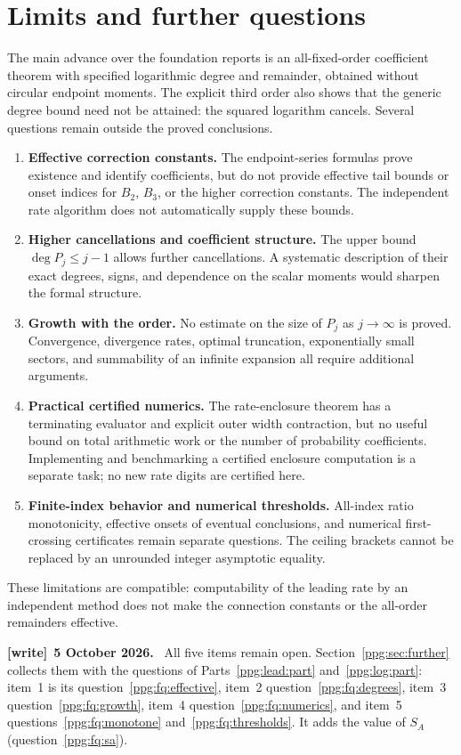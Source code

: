 \documentclass[11pt,letterpaper]{article}
\theoremstyle{remark}\newtheorem{remark}[theorem]{Remark}
\numberwithin{equation}{section}
\newenvironment{writenote}[1][]{\par\smallskip\begingroup\small
 \noindent\textbf{[write]}\if\relax\detokenize{#1}\relax\else~\textbf{#1.}\fi\ }%
 {\par\endgroup\smallskip}
\begin{document}
\section{Limits and further questions}\label{ppg:all:sec:limits}
The main advance over the foundation reports is an all-fixed-order coefficient theorem with specified logarithmic degree and remainder, obtained without circular endpoint moments. The explicit third order also shows that the generic degree bound need not be attained: the squared logarithm cancels. Several questions remain outside the proved conclusions.
\begin{enumerate}
\item \textbf{Effective correction constants.} The endpoint-series formulas prove existence and identify coefficients, but do not provide effective tail bounds or onset indices for $B_2$, $B_3$, or the higher correction constants. The independent rate algorithm does not automatically supply these bounds.
\item \textbf{Higher cancellations and coefficient structure.} The upper bound $\deg P_j\le j-1$ allows further cancellations. A systematic description of their exact degrees, signs, and dependence on the scalar moments would sharpen the formal structure.
\item \textbf{Growth with the order.} No estimate on the size of $P_j$ as $j\to\infty$ is proved. Convergence, divergence rates, optimal truncation, exponentially small sectors, and summability of an infinite expansion all require additional arguments.
\item \textbf{Practical certified numerics.} The rate-enclosure theorem has a terminating evaluator and explicit outer width contraction, but no useful bound on total arithmetic work or the number of probability coefficients. Implementing and benchmarking a certified enclosure computation is a separate task; no new rate digits are certified here.
\item \textbf{Finite-index behavior and numerical thresholds.} All-index ratio monotonicity, effective onsets of eventual conclusions, and numerical first-crossing certificates remain separate questions. The ceiling brackets cannot be replaced by an unrounded integer asymptotic equality.
\end{enumerate}
These limitations are compatible: computability of the leading rate by an independent method does not make the connection constants or the all-order remainders effective.
\begin{writenote}[5 October 2026]
All five items remain open. Section~\ref{ppg:sec:further} collects them with the questions of Parts~\ref{ppg:lead:part} and~\ref{ppg:log:part}: item~1 is its question~\ref{ppg:fq:effective}, item~2 question~\ref{ppg:fq:degrees}, item~3 question~\ref{ppg:fq:growth}, item~4 question~\ref{ppg:fq:numerics}, and item~5 questions~\ref{ppg:fq:monotone} and~\ref{ppg:fq:thresholds}. It adds the value of $S_A$ (question~\ref{ppg:fq:sa}).
\end{writenote}
\end{document}
